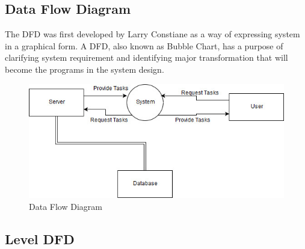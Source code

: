 \newpage
\subsection{Data Flow Diagram}
The DFD was first developed by Larry Constiane as a way of expressing system in a graphical form. A DFD, also known as Bubble Chart, has a purpose of clarifying system requirement and identifying major transformation that will become the programs in the system design.
\begin{figure}[h]
	\label{ss}    %
	\centering
	\includegraphics[width= 13 cm]{dfd3.jpg}
	\caption{Data Flow Diagram}
\end{figure}



\newpage
\subsection{Level DFD}



